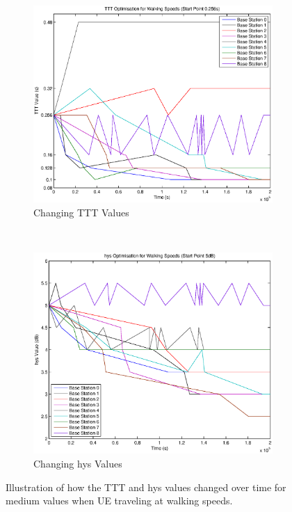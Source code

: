 \begin{figure}[H]
        \centering
        \begin{subfigure}[b]{0.49\textwidth}
                \includegraphics[width=\textwidth]{figures/walking_figures/mid/long_ttt.eps}
                \caption{Changing TTT Values}
                \label{fig:walk_mid_ttt}
        \end{subfigure}%
        ~ %
        \begin{subfigure}[b]{0.49\textwidth}
                \includegraphics[width=\textwidth]{figures/walking_figures/mid/long_hys.eps}
                \caption{Changing hys Values}
                \label{fig:walk_mid_hys}
        \end{subfigure}
        \caption{Illustration of how the TTT and hys values changed over time for medium values when UE traveling at walking speeds.}\label{fig:walk_mid_ttthys}
\end{figure}

